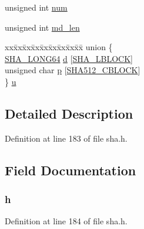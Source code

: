 \begin{DoxyCompactItemize}
\begin{tabbing}
\end{tabbing}\item 
unsigned int \hyperlink{struct_s_h_a512state__st_a41ddefd3473727cad32a9767c10faed8}{num}
\item 
unsigned int \hyperlink{struct_s_h_a512state__st_a0d87e60065bbf0161a8587c011168d6c}{md\+\_\+len}
\item 
\begin{tabbing}
xx\=xx\=xx\=xx\=xx\=xx\=xx\=xx\=xx\=\kill
union \{\\
\>\hyperlink{include_2openssl_2sha_8h_a26681fbb750476e9b7532b8744916024}{SHA\_LONG64} \hyperlink{struct_s_h_a512state__st_a90a4b0655724c1af4884f929f2ade45f}{d} \mbox{[}\hyperlink{include_2openssl_2sha_8h_a8902af97bc4411166213b43c6d2057d2}{SHA\_LBLOCK}\mbox{]}\\
\>unsigned char \hyperlink{struct_s_h_a512state__st_a2f3a1cc4e437a508391b2b4ec2c0e572}{p} \mbox{[}\hyperlink{include_2openssl_2sha_8h_a322ff23dfbf746e0864f4e81786141b6}{SHA512\_CBLOCK}\mbox{]}\\
\} \hyperlink{struct_s_h_a512state__st_ae109df267f21a0a94cfd491120d25f2d}{u}\\

\end{tabbing}\end{DoxyCompactItemize}


\subsection{Detailed Description}


Definition at line 183 of file sha.\+h.



\subsection{Field Documentation}
\subsubsection[{\texorpdfstring{h}{h}}]{ h}\hypertarget{struct_s_h_a512state__st_aa863cca2bee8e84059783d0ea425296a}{}\label{struct_s_h_a512state__st_aa863cca2bee8e84059783d0ea425296a}


Definition at line 184 of file sha.\+h.

